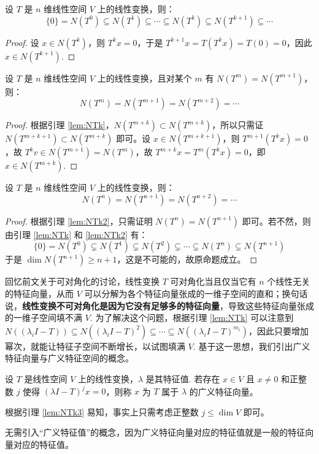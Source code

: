 \begin{lemma}
\label{lem:NTk}
设 $T$ 是 $n$ 维线性空间 $V$ 上的线性变换，则：
\[
    \{0\}=N(T^0)\subseteq N(T^1)\subseteq \cdots\subseteq N(T^k)\subseteq N(T^{k+1})\subseteq \cdots
\]
\end{lemma}
\begin{proof}
设 $x\in N(T^k)$，则 $T^kx=0$，于是 $T^{k+1}x=T(T^kx)=T(0)=0$，因此 $x\in N(T^{k+1})$.
\end{proof}

\begin{lemma}
\label{lem:NTk2}
设 $T$ 是 $n$ 维线性空间 $V$ 上的线性变换，且对某个 $m$ 有 $N(T^m)=N(T^{m+1})$，则：
\[
    N(T^m)=N(T^{m+1})=N(T^{m+2})=\cdots
\]
\end{lemma}
\begin{proof}
根据引理 \ref{lem:NTk}，$N(T^{m+k})\subset N(T^{m+k})$，所以只需证 $N(T^{m+k+1})\subset N(T^{m+k})$ 即可。设 $x\in N(T^{m+k+1})$，则 $T^{m+1}(T^kx)=0$，故 $T^kv\in N(T^{m+1})=N(T^m)$，故 $T^{m+k}x=T^m(T^kx)=0$，即 $x\in N(T^{m+k})$.
\end{proof}

\begin{lemma}
\label{lem:NTk3}
设 $T$ 是 $n$ 维线性空间 $V$ 上的线性变换，则：
\[
    N(T^n)=N(T^{n+1})=N(T^{n+2})=\cdots
\]
\end{lemma}
\begin{proof}
根据引理 \ref{lem:NTk2}，只需证明 $N(T^n)=N(T^{n+1})$ 即可。若不然，则由引理 \ref{lem:NTk} 和 \ref{lem:NTk2} 有：
\[
    \{0\}=N(T^0)\subsetneq N(T^1)\subsetneq N(T^2)\subsetneq\cdots\subsetneq N(T^n)\subsetneq N(T^{n+1})
\]
于是 $\dim N(T^{n+1})\geq n+1$，这是不可能的，故原命题成立。
\end{proof}

回忆前文关于可对角化的讨论，线性变换 $T$ 可对角化当且仅当它有 $n$ 个线性无关的特征向量，从而 $V$ 可以分解为各个特征向量张成的一维子空间的直和；换句话说，\textbf{线性变换不可对角化是因为它没有足够多的特征向量}，导致这些特征向量张成的一维子空间填不满 $V$. 为了解决这个问题，根据引理 \ref{lem:NTk} 可以注意到 $N((\lambda_iI-T))\subseteq N((\lambda_iI-T)^2)\subseteq\cdots\subseteq N((\lambda_iI-T)^{m_i})$，因此只要增加幂次，就能让特征子空间不断增长，以试图填满 $V$. 基于这一思想，我们引出广义特征向量与广义特征空间的概念。


\begin{definition}[广义特征向量]
设 $T$ 是线性空间 $V$ 上的线性变换，$\lambda$ 是其特征值. 若存在 $x\in V$ 且 $x\neq 0$ 和正整数 $j$ 使得 $(\lambda I-T)^jx=0$，则称 $x$ 为 $T$ 属于 $\lambda$ 的广义特征向量。
\end{definition}
\begin{com}
根据引理 \ref{lem:NTk3} 易知，事实上只需考虑正整数 $j\leq\dim V$ 即可。
\end{com}
\begin{com}
无需引入“广义特征值”的概念，因为广义特征向量对应的特征值就是一般的特征向量对应的特征值。
\end{com}

